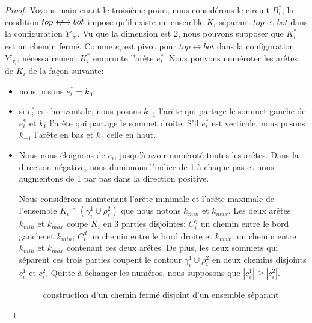 \documentclass[titlepage,a4paper,12pt]{article}
\newcommand{\nlongleftrightarrow}{\longleftrightarrow \kern-15pt\not \kern15pt}
\begin{document}
\begin{proof}
Voyons maintenant le troisième point, nous considérons le circuit $B_i^*$, la condition $top\nlongleftrightarrow bot$ impose qu'il existe un ensemble $K_i$ séparant $top$ et $bot$ dans la configuration $Y'_{\tau_i}$. Vu que la dimension est 2, nous pouvons supposer que $K_i^*$ est un chemin fermé. Comme $e_i$ est pivot pour $top\longleftrightarrow bot$ dans la configuration $Y'_{\tau_i}$, nécessairement $K_i^*$ emprunte l'arête $e_i^*$. Nous pouvons numéroter les arêtes de $K_i$ de la façon suivante:
\begin{itemize}[label = $\bullet$, leftmargin =*]
\item nous posons $e^*_i = k_0$;
\item si $e^*_i$ est horizontale, nous posons $k_{-1}$ l'arête qui partage le sommet gauche de $e^*_i$ et $k_1$ l'arête qui partage le sommet droite. S'il $e_i^*$ est verticale, nous posons $k_{-1}$ l'arête en bas et $k_1$ celle en haut.
\item Nous nous éloignons de $e_i$, jusqu'à avoir numéroté toutes les arêtes. Dans la direction négative, nous diminuons l'indice de 1 à chaque pas et nous augmentons de 1 par pas dans la direction positive.


Nous considérons maintenant l'arête minimale et l'arête maximale de l'ensemble $K_i\cap (\gamma_i^1\cup \rho_i^2)$ que nous notons $k_{min}$ et $k_{max}$. Les deux arêtes $k_{min}$ et $k_{max}$ coupe $K_i$ en 3 parties disjointes: $C^g_i$ un chemin entre le bord gauche et $k_{min}$; $C^d_i$ un chemin entre le bord droite et $k_{max}$; un chemin entre $k_{min}$ et $k_{max}$ contenant ces deux arêtes. De plus, les deux sommets qui séparent ces trois parties coupent le contour $\gamma_i^1\cup \rho_i^2$ en deux chemins disjoints $c_i^1$ et $c_i^2$. Quitte à échanger les numéros, nous supposons que $|c_i^1| \geqslant |c_i^2|$.
\begin{figure}[h]
\center
{}
\caption{construction d'un chemin fermé disjoint d'un ensemble séparant}
\end{figure}


\end{itemize}
\end{proof}
\end{document}
